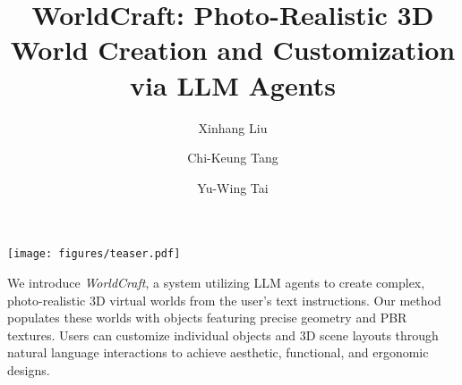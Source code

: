 \documentclass[acmtog,authorversion,nonacm]{acmart}
\begin{document}
\title{WorldCraft: Photo-Realistic 3D World Creation and Customization via LLM Agents}


\author{Xinhang Liu}

\author{Chi-Keung Tang}


\author{Yu-Wing Tai}


\makeatletter
\let\@authorsaddresses\@empty
\makeatother

\renewcommand\shortauthors{Liu et al.}
\newcommand{\TODO}[1]{\textbf{\color{red}[TODO: #1]}}

\begin{abstract}


\end{abstract}






\begin{teaserfigure}
\begin{center}
    \texttt{[image: figures/teaser.pdf]}
\end{center}
\caption{
We introduce \emph{WorldCraft}, a system utilizing LLM agents to create complex, photo-realistic 3D virtual worlds from the user's text instructions. Our method populates these worlds with objects featuring precise geometry and PBR textures. Users can customize individual objects and 3D scene layouts through natural language interactions to achieve aesthetic, functional, and ergonomic designs.
}
\label{fig:teaser}
\end{teaserfigure}


\maketitle




\end{document}
